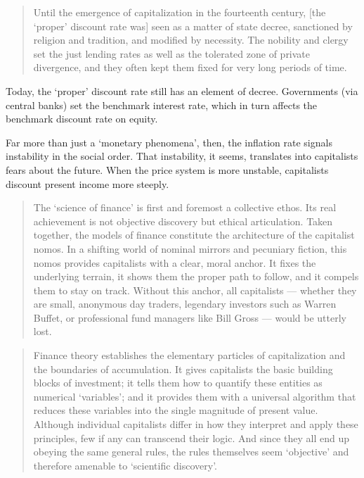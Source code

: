 \documentclass[
]{book}
\begin{document}
\begin{quote}
Until the emergence of capitalization in the fourteenth century, {[}the `proper' discount rate was{]} seen as a matter of state decree, sanctioned by religion and tradition, and modified by necessity. The nobility and clergy set the just lending rates as well as the tolerated zone of private divergence, and they often kept them fixed for very long periods of time.
\end{quote}

Today, the `proper' discount rate still has an element of decree. Governments (via central banks) set the benchmark interest rate, which in turn affects the benchmark discount rate on equity.

Far more than just a `monetary phenomena', then, the inflation rate signals instability in the social order. That instability, it seems, translates into capitalists fears about the future. When the price system is more unstable, capitalists discount present income more steeply.

\begin{quote}
The `science of finance' is first and foremost a collective ethos. Its real achievement is not objective discovery but ethical articulation. Taken together, the models of finance constitute the architecture of the capitalist nomos. In a shifting world of nominal mirrors and pecuniary fiction, this nomos provides capitalists with a clear, moral anchor. It fixes the underlying terrain, it shows them the proper path to follow, and it compels them to stay on track. Without this anchor, all capitalists --- whether they are small, anonymous day traders, legendary investors such as Warren Buffet, or professional fund managers like Bill Gross --- would be utterly lost.
\end{quote}

\begin{quote}
Finance theory establishes the elementary particles of capitalization and the boundaries of accumulation. It gives capitalists the basic building blocks of investment; it tells them how to quantify these entities as numerical `variables'; and it provides them with a universal algorithm that reduces these variables into the single magnitude of present value. Although individual capitalists differ in how they interpret and apply these principles, few if any can transcend their logic. And since they all end up obeying the same general rules, the rules themselves seem `objective' and therefore amenable to `scientific discovery'.
\end{quote}
\end{document}
